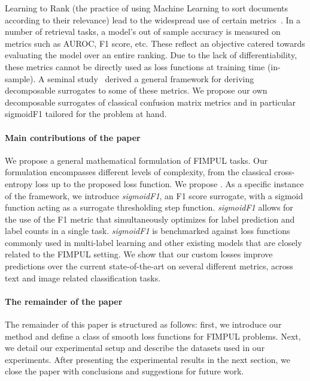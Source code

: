 Learning to Rank (the practice of using Machine Learning to sort documents according to their relevance) lead to the widespread use of certain metrics~\cite{LTR}. In a number of retrieval tasks, a model's out of sample accuracy is measured on metrics such as AUROC, F1 score, etc. These reflect an objective catered towards evaluating the model over an entire ranking. Due to the lack of differentiability, these metrics cannot be directly used as loss functions at training time (in-sample). A seminal study~\cite{optimizableLosses} derived a general framework for deriving decomposable surrogates to some of these metrics. We propose our own decomposable surrogates of classical confusion matrix metrics and in particular sigmoidF1 tailored for the problem at hand.
\fi

\paragraph{Main contributions of the paper}
We propose a general mathematical formulation of FIMPUL tasks. 
Our formulation encompasses different levels of complexity, from the classical cross-entropy loss up to the proposed loss function. 
We propose .
As a specific instance of the framework, we introduce \emph{sigmoidF1}, an F1 score surrogate, with a sigmoid function acting as a surrogate thresholding step function. 
\emph{sigmoidF1} allows for the use of the F1 metric that simultaneously optimizes for label prediction and label counts in a single task.  
\emph{sigmoidF1} is benchmarked against loss functions commonly used in multi-label learning and other existing models that are closely related to the FIMPUL setting. We show that our custom losses improve predictions over the current state-of-the-art on several different metrics, across text and image related classification tasks. 

\paragraph{The remainder of the paper}
The remainder of this paper is structured as follows: first, we introduce our method and define a class of smooth loss functions for FIMPUL problems. Next, we detail our experimental setup and describe the datasets used in our experiments. After presenting the experimental results in the next section, we close the paper with conclusions and suggestions for future work.



